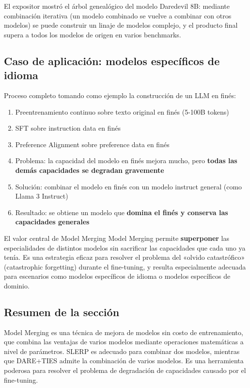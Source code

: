 \documentclass[a4paper]{article}
\begin{document}
El expositor mostró el árbol genealógico del modelo Daredevil 8B: mediante combinación iterativa (un modelo combinado se vuelve a combinar con otros modelos) se puede construir un linaje de modelos complejo, y el producto final supera a todos los modelos de origen en varios benchmarks.

\subsection{Caso de aplicación: modelos específicos de idioma}

Proceso completo tomando como ejemplo la construcción de un LLM en finés:

\begin{enumerate}
    \item Preentrenamiento continuo sobre texto original en finés (5-100B tokens)
    \item SFT sobre instruction data en finés
    \item Preference Alignment sobre preference data en finés
    \item Problema: la capacidad del modelo en finés mejora mucho, pero \textbf{todas las demás capacidades se degradan gravemente}
    \item Solución: combinar el modelo en finés con un modelo instruct general (como Llama 3 Instruct)
    \item Resultado: se obtiene un modelo que \textbf{domina el finés y conserva las capacidades generales}
\end{enumerate}

\begin{importantbox}{El valor central de Model Merging}
Model Merging permite \textbf{superponer} las especialidades de distintos modelos sin sacrificar las capacidades que cada uno ya tenía. Es una estrategia eficaz para resolver el problema del «olvido catastrófico» (catastrophic forgetting) durante el fine-tuning, y resulta especialmente adecuada para escenarios como modelos específicos de idioma o modelos específicos de dominio.
\end{importantbox}

\subsection{Resumen de la sección}

Model Merging es una técnica de mejora de modelos sin costo de entrenamiento, que combina las ventajas de varios modelos mediante operaciones matemáticas a nivel de parámetros. SLERP es adecuado para combinar dos modelos, mientras que DARE+TIES admite la combinación de varios modelos. Es una herramienta poderosa para resolver el problema de degradación de capacidades causado por el fine-tuning.
\end{document}
